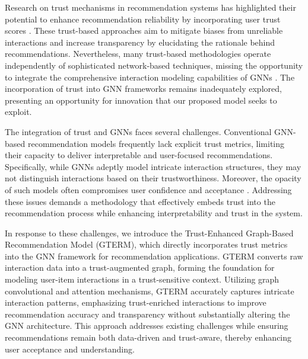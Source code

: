 \documentclass{article} %
\begin{document}
Research on trust mechanisms in recommendation systems has highlighted their potential to enhance recommendation reliability by incorporating user trust scores \citep{massa2007trust, guo2017trust}. These trust-based approaches aim to mitigate biases from unreliable interactions and increase transparency by elucidating the rationale behind recommendations. Nevertheless, many trust-based methodologies operate independently of sophisticated network-based techniques, missing the opportunity to integrate the comprehensive interaction modeling capabilities of GNNs \citep{konstas2009social, ma2011recommender}. The incorporation of trust into GNN frameworks remains inadequately explored, presenting an opportunity for innovation that our proposed model seeks to exploit.

The integration of trust and GNNs faces several challenges. Conventional GNN-based recommendation models frequently lack explicit trust metrics, limiting their capacity to deliver interpretable and user-focused recommendations. Specifically, while GNNs adeptly model intricate interaction structures, they may not distinguish interactions based on their trustworthiness. Moreover, the opacity of such models often compromises user confidence and acceptance \citep{zhang2014explicit}. Addressing these issues demands a methodology that effectively embeds trust into the recommendation process while enhancing interpretability and trust in the system.

In response to these challenges, we introduce the Trust-Enhanced Graph-Based Recommendation Model (GTERM), which directly incorporates trust metrics into the GNN framework for recommendation applications. GTERM converts raw interaction data into a trust-augmented graph, forming the foundation for modeling user-item interactions in a trust-sensitive context. Utilizing graph convolutional and attention mechanisms, GTERM accurately captures intricate interaction patterns, emphasizing trust-enriched interactions to improve recommendation accuracy and transparency without substantially altering the GNN architecture. This approach addresses existing challenges while ensuring recommendations remain both data-driven and trust-aware, thereby enhancing user acceptance and understanding.
\end{document}
